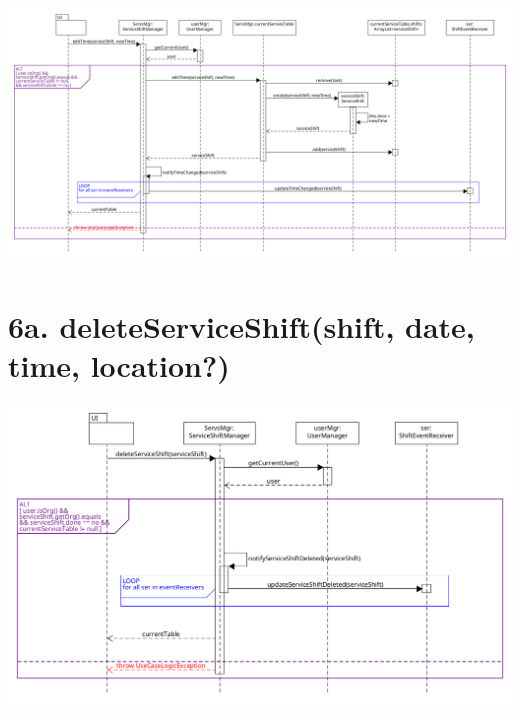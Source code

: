 \begin{center}
  \includegraphics[scale = 0.28]{images/DSD/Esame DSD 6.png}
\end{center}

\section*{6a. deleteServiceShift(shift, date, time, location?)}

\begin{center}
  \includegraphics[scale = 0.28]{images/DSD/Esame DSD 6a.png}
\end{center}

